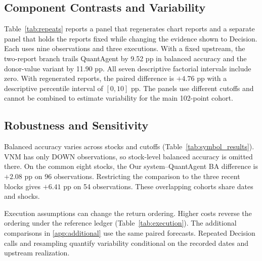 \subsection{Component Contrasts and Variability}
Table~\ref{tab:repeats} reports a panel that regenerates chart reports and
a separate panel that holds the reports fixed while changing the
evidence shown to Decision. Each uses nine observations and three
executions. With a fixed upstream, the two-report branch trails
QuantAgent by 9.52 pp in balanced accuracy and the donor-value
variant by 11.90 pp. All seven descriptive factorial intervals include
zero. With regenerated reports, the paired difference is $+4.76$ pp
with a descriptive percentile interval of $[0,10]$ pp. The panels use
different cutoffs and cannot be combined to estimate variability for
the main 102-point cohort.



\subsection{Robustness and Sensitivity}
Balanced accuracy varies across stocks and cutoffs
(Table~\ref{tab:symbol_results}). VNM has only DOWN observations, so
stock-level balanced accuracy is omitted there. On the common eight
stocks, the Our system--QuantAgent BA difference is $+2.08$ pp on 96
observations. Restricting the comparison to the three recent blocks
gives $+6.41$ pp on 54 observations. These overlapping cohorts share
dates and shocks.

Execution assumptions can change the return ordering. Higher costs
reverse the ordering under the reference ledger (Table~\ref{tab:execution}).
The additional comparisons in \ref{app:additional} use the same paired
forecasts. Repeated Decision calls and resampling quantify variability
conditional on the recorded dates and upstream realization.
